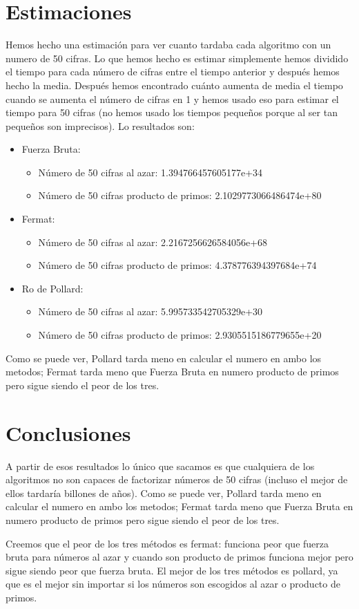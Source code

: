 \documentclass{article}
\begin{document}
    \section{Estimaciones}
    Hemos hecho una  estimación para ver cuanto tardaba cada algoritmo con un numero de 50 cifras. Lo que hemos hecho es estimar simplemente hemos dividido el tiempo para cada número de cifras entre el tiempo anterior y después hemos hecho la media. Después hemos encontrado cuánto aumenta de media el tiempo cuando se aumenta el número de cifras en 1 y hemos usado eso para estimar el tiempo para 50 cifras (no hemos usado los tiempos pequeños porque al ser tan pequeños son imprecisos).
    Lo resultados son:
    \begin{itemize}
        \item Fuerza Bruta:
        \begin{itemize}
            \item Número de 50 cifras al azar: 1.394766457605177e+34
            \item Número de 50 cifras producto de primos: 2.1029773066486474e+80
        \end{itemize}
        \item Fermat:
        \begin{itemize}
            \item Número de 50 cifras al azar: 2.2167256626584056e+68
            \item Número de 50 cifras producto de primos: 4.378776394397684e+74
        \end{itemize}
        \item Ro de Pollard:
        \begin{itemize}
            \item Número de 50 cifras al azar: 5.995733542705329e+30
            \item Número de 50 cifras producto de primos: 2.9305515186779655e+20
        \end{itemize}
    \end{itemize}

    Como se puede ver, Pollard tarda meno en calcular el numero en ambo los metodos; Fermat tarda meno que Fuerza Bruta en numero producto de primos pero sigue siendo el peor de los tres.

    \newpage

    \section{Conclusiones}

    A partir de esos resultados lo único que sacamos es que cualquiera de los algoritmos no son capaces de factorizar números de 50 cifras (incluso el mejor de ellos tardaría billones de años). Como se puede ver, Pollard tarda meno en calcular el numero en ambo los metodos; Fermat tarda meno que Fuerza Bruta en numero producto de primos pero sigue siendo el peor de los tres.

    \newblock
    Creemos que el peor de los tres métodos es fermat: funciona peor que fuerza bruta para números al azar y cuando son producto de primos funciona mejor pero sigue siendo peor que fuerza bruta. El mejor de los tres métodos es pollard, ya que es el mejor sin importar si los números son escogidos al azar o producto de primos.
\end{document}
